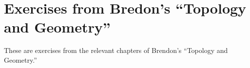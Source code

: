 \chapter{Exercises from Bredon's ``Topology and Geometry''}
These are exercises from the relevant chapters of Brendon's ``Topology and
Geometry.''

